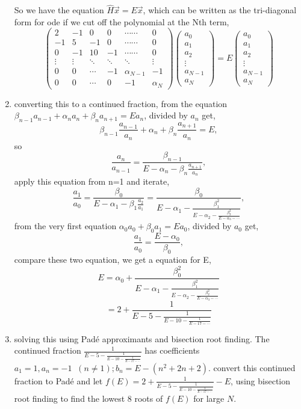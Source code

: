 \documentclass{article}
\begin{document}
\begin{enumerate}
So we have the equation $\hat{H}\vec{x}=E\vec{x}$, which can be written as the tri-diagonal form for ode if we cut off the polynomial at the Nth term,
\[\left(\begin{array}{cccccc}
2 & -1 & 0 & 0 & \cdots\cdots  &0\\
-1 & 5 & -1 & 0 & \cdots\cdots & 0\\
0 & -1 & 10 & -1 & \cdots\cdots & 0\\
\vdots&\vdots&\ddots&\ddots&\ddots&\vdots\\
0 & 0 & \cdots & -1 & \alpha_{N-1} & -1\\
0 & 0 & \cdots & 0 &-1& \alpha_N \end{array} \right)\left(\begin{array}{c}
a_0\\a_1\\a_2\\ \vdots\\ a_{N-1}\\ a_N\end{array} \right)=E\left(\begin{array}{c}
a_0\\a_1\\a_2\\ \vdots\\ a_{N-1}\\ a_N\end{array} \right)\]


\item converting this to a continued fraction,
from the equation $\beta_{n-1}a_{n-1}+\alpha_na_n+\beta_na_{n+1}=Ea_n$, divided by $a_n$ get,
\[\beta_{n-1}\frac{a_{n-1}}{a_n}+\alpha_n+\beta_n\frac{a_{n+1}}{a_n}=E,\]
so\[\frac{a_n}{a_{n-1}}=\frac{\beta_{n-1}}{E-\alpha_n-\beta_n\frac{a_{n+1}}{a_n}},\]
apply this equation from n=1 and iterate,
\[\frac{a_1}{a_0}=\frac{\beta_0}{E-\alpha_1-\beta_1\frac{a_2}{a_1}}=\frac{\beta_0}{E-\alpha_1-\frac{\beta_1^2}{E-\alpha_2-\frac{\beta_2^2}{E-\alpha_3-\cdots}}},\]
from the very first equation $\alpha_0a_0+\beta_0a_1=Ea_0$, divided by $a_0$ get,
\[\frac{a_1}{a_0}=\frac{E-\alpha_0}{\beta_0},\]
compare these two equation, we get a equation for E,
\[E=\alpha_0+\frac{\beta_0^2}{E-\alpha_1-\frac{\beta_1^2}{E-\alpha_2-\frac{\beta_2^2}{E-\alpha_3-\cdots}}}\]
\[=2+\frac{1}{E-5-\frac{1}{E-10-\frac{1}{E-17-\cdots}}}\]

\item solving this using Pad\'{e} approximants and bisection root finding.
The continued fraction $\frac{1}{E-5-\frac{1}{E-10-\frac{1}{E-17-\cdots}}}$ has coefficients $a_1=1, a_n=-1\;\;(n\not=1); b_n=E-(n^2+2n+2).$ convert this continued fraction to Pad\'{e} and let $f(E)=2+\frac{1}{E-5-\frac{1}{E-10-\frac{1}{E-17-\cdots}}}-E$, using bisection root finding to find the lowest 8 roots of $f(E)$ for large $N$.
\end{enumerate}
\end{document}
